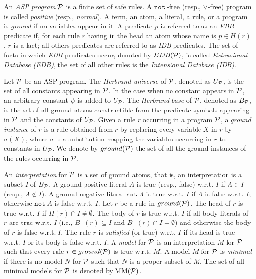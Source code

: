 \documentclass[preprint]{tlp}
\newcommand{\naf}{\ensuremath{\mathtt{not\ }}}
\newcommand{\p}{\ensuremath{{\cal P}}\xspace}
\newcommand{\BP}{\ensuremath{B_{\p}}\xspace}
\newcommand{\UP}{\ensuremath{U_{\p}}\xspace}
\begin{document}
An {\em ASP program} $\p$ is a finite set of safe rules. A
$\naf$-free (resp., $\lor$-free) program is called {\em positive}\/
(resp., {\em normal}).  A term, an atom, a literal, a rule, or a
program is {\em ground} if no variables appear in it.
A predicate $p$ is referred to as an {\em EDB} predicate if, for
each rule $r$ having in the head an atom whose name is $p \in H(r)$, $r$ is a fact; all others
predicates are referred to as {\em IDB} predicates. The set of facts
in which {\em EDB} predicates occur, denoted by $EDB(\p)$, is called {\em Extensional
Database (EDB)}, the set of all other rules is the {\em Intensional Database (IDB)}.

Let $\p$ be an ASP program. The {\em Herbrand universe}
of $\p$, denoted as $U_{\p}$, is the set of all constants appearing
in $\p$. In the case when no constant appears in $\p$, an arbitrary constant
$\psi$ is added to $U_{\p}$. The {\em Herbrand base} of \p{},
denoted as $B _{\p}$, is the set of all ground atoms constructible
from the predicate symbols appearing in $\p$ and the constants of
$U_{\p}$.
Given a rule $r$ occurring in a program $\p$, a {\em ground
instance} of  $r$ is a rule obtained from $r$ by replacing every
variable $X$ in $r$ by $\sigma (X)$, where $\sigma$
 is a substitution mapping the variables occurring in $r$ to
constants in $\UP$. We denote by $ground( \p)$ the set of all the
ground instances of the rules occurring in $\p$.

 An {\em interpretation} for $\p$ is a set of ground atoms, that
is, an interpretation is a subset $I$ of $\BP$. A ground positive
literal $A$ is true (resp., false) w.r.t. $I$ if
 $A \in I$ (resp.,  $A \not\in I$). A ground
negative literal $\naf A$ is true w.r.t. $I$ if $A$ is false
w.r.t. $I$; otherwise $\naf A$ is false w.r.t. $I$.
Let  $r$ be a rule in $ground( \p )$.  The head of $r$ is
true w.r.t. $I$ if $H(r) \cap I \neq \emptyset$. The body of
 $r$ is true w.r.t. $I$ if all body
literals of  $r$ are true w.r.t.  $I$ (i.e.,  $B^+(r) \subseteq I$
and  $B^-(r)\cap I = \emptyset$) and otherwise the body of $r$ is false w.r.t. $I$.
The rule  $r$ is {\em satisfied} (or true) w.r.t.
 $I$ if its head is true w.r.t.  $I$ or its body
is false w.r.t.  $I$.
A {\em model} for  $\p$
 is an interpretation  $M$ for
 $\p$ such that every rule  $r \in ground(\p)$ is
true w.r.t.  $M$.  A model  $M$ for  $\p$ is {\em minimal} if there is no
model  $N$ for $\p$
such that $N$ is a proper subset of  $M$. The set of all minimal
models for  $\p$ is denoted by  ${\rm MM}(\p )$.
\end{document}
